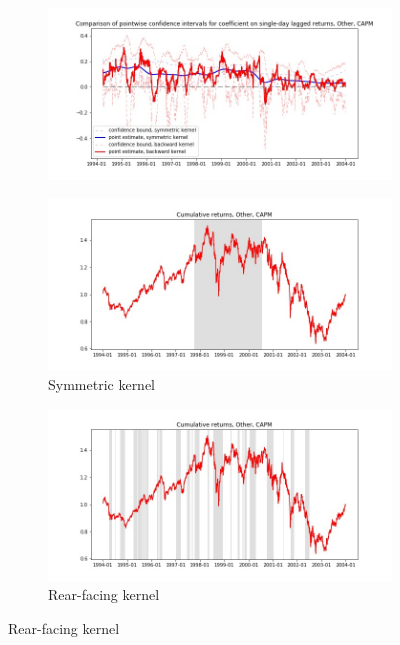 \documentclass{article}
\begin{document}
\newpage

\begin{figure}

\centering

  \begin{subfigure}[b]{\textwidth}
    \includegraphics[width=\textwidth]{Other/pointwiseCIs_layered_CAPM.jpg}
    \label{fig:1}
  \end{subfigure}
  \begin{subfigure}[b]{0.45\textwidth}
    \includegraphics[width=\textwidth]{Other/full_cumrets_ofint_CAPM.jpg}
    \caption*{Symmetric kernel}
    \label{fig:2}
  \end{subfigure}
   \begin{subfigure}[b]{0.45\textwidth}
    \includegraphics[width=\textwidth]{Other/bwunif_full_cumrets_ofint_CAPM.jpg}
    \caption*{Rear-facing kernel}
    \label{fig:2}
  \end{subfigure}
  
\end{figure}
\end{document}
